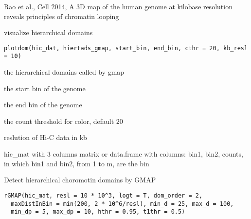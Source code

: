 \documentclass[a4paper]{book}
\begin{document}
%
\begin{Source}\relax
Rao et al., Cell 2014, A 3D map of the human genome at kilobase resolution reveals principles of chromatin looping
\end{Source}
%
\begin{Description}\relax
visualize hierarchical domains
\end{Description}
%
\begin{Usage}
\begin{verbatim}
plotdom(hic_dat, hiertads_gmap, start_bin, end_bin, cthr = 20, kb_resl = 10)
\end{verbatim}
\end{Usage}
%
\begin{Arguments}
\begin{ldescription}
\item[\code{hiertads\_gmap}] the hierarchical domains called by gmap

\item[\code{start\_bin}] the start bin of the genome

\item[\code{end\_bin}] the end bin of the genome

\item[\code{cthr}] the count threshold for color, default 20

\item[\code{kb\_resl}] reslution of Hi-C data in kb

\item[\code{hic\_mat}] hic\_mat with 3 columns
matrix or data.frame with columns: bin1, bin2, counts, in which bin1 and bin2, from 1 to m, are the bin
\end{ldescription}
\end{Arguments}
%
\begin{Description}\relax
Detect hierarchical choromotin domains by GMAP
\end{Description}
%
\begin{Usage}
\begin{verbatim}
rGMAP(hic_mat, resl = 10 * 10^3, logt = T, dom_order = 2,
  maxDistInBin = min(200, 2 * 10^6/resl), min_d = 25, max_d = 100,
  min_dp = 5, max_dp = 10, hthr = 0.95, t1thr = 0.5)
\end{verbatim}
\end{Usage}
%
\end{document}
